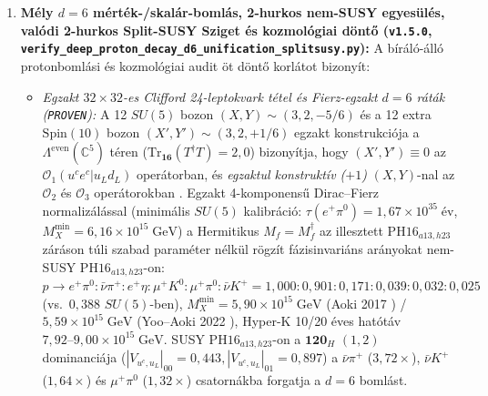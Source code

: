 \documentclass[11pt,a4paper]{article}
\begin{document}
\begin{enumerate}
\begin{itemize}
    \end{itemize}
    Így $\tan\beta=50$-nél a nem finomhangolt $12\text{--}30\;\mathrm{TeV}$-es Mini-Split SUSY kizárt.
    \item \textbf{Mély $d=6$ mérték-/skalár-bomlás, 2-hurkos nem-SUSY egyesülés, valódi 2-hurkos Split-SUSY Sziget és kozmológiai döntő (\texttt{v1.5.0}, \texttt{verify\_\allowbreak deep\_\allowbreak proton\_\allowbreak decay\_\allowbreak d6\_\allowbreak unification\_\allowbreak splitsusy.py}):}
    A bíráló-álló protonbomlási és kozmológiai audit öt döntő korlátot bizonyít:
    \begin{itemize}
        \item \emph{Egzakt $32\times 32$-es Clifford 24-leptokvark tétel és Fierz-egzakt $d=6$ ráták (\texttt{PROVEN}):} A 12 $SU(5)$ bozon $(X,Y)\sim(3,2,-5/6)$ és a 12 extra $\mathrm{Spin}(10)$ bozon $(X',Y')\sim(3,2,+1/6)$ egzakt konstrukciója a $\Lambda^{\mathrm{even}}(\mathbb{C}^5)$ téren ($\mathrm{Tr}_{\mathbf{16}}(T^\dagger T)=2{,}0$) bizonyítja, hogy $(X',Y')\equiv 0$ az $\mathcal{O}_1(u^c e^c|u_L d_L)$ operátorban, és \emph{egzaktul konstruktív ($+1$)} $(X,Y)$-nal az $\mathcal{O}_2$ és $\mathcal{O}_3$ operátorokban \cite{NathPerez2007}. Egzakt 4-komponensű Dirac--Fierz normalizálással (minimális $SU(5)$ kalibráció: $\tau(e^+\pi^0)=1{,}67\times 10^{35}\;\text{év}$, $M_X^{\min}=6{,}16\times 10^{15}\;\mathrm{GeV}$) a Hermitikus $M_f=M_f^\dagger$ az illesztett $\mathrm{PH16}_{a13,h23}$ záráson túli szabad paraméter nélkül rögzít fázisinvariáns arányokat nem-SUSY $\mathrm{PH16}_{a13,h23}$-on: $p\to e^+\pi^0 : \bar\nu\pi^+ : e^+\eta : \mu^+ K^0 : \mu^+\pi^0 : \bar\nu K^+ = 1{,}000 : 0{,}901 : 0{,}171 : 0{,}039 : 0{,}032 : 0{,}025$ (vs.\ $0{,}388$ $SU(5)$-ben), $M_X^{\min}=5{,}90\times 10^{15}\;\mathrm{GeV}$ (Aoki 2017 \cite{Aoki2017}) / $5{,}59\times 10^{15}\;\mathrm{GeV}$ (Yoo--Aoki 2022 \cite{Aoki2022}), Hyper-K 10/20 éves hatótáv $7{,}92\text{--}9{,}00\times 10^{15}\;\mathrm{GeV}$. SUSY $\mathrm{PH16}_{a13,h23}$-on a $\mathbf{120}_H$ $(1,2)$ dominanciája ($|V_{u^c,u_L}|_{00}=0{,}443, |V_{u^c,u_L}|_{01}=0{,}897$) a $\bar\nu\pi^+$ ($3{,}72\times$), $\bar\nu K^+$ ($1{,}64\times$) és $\mu^+\pi^0$ ($1{,}32\times$) csatornákba forgatja a $d=6$ bomlást.

\end{itemize}
\end{enumerate}
\end{document}
